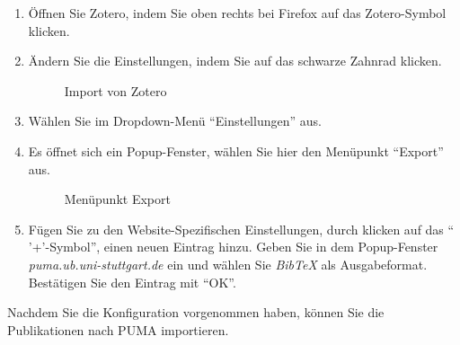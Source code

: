 \begin{enumerate}
    \item Öffnen Sie Zotero, indem Sie oben rechts bei Firefox auf das Zotero-Symbol klicken.
    \item Ändern Sie die Einstellungen, indem Sie auf das schwarze Zahnrad klicken. 
\begin{figure}[h!]
 \centering
 \caption{Import von Zotero}
 \label{fig:importZotero}
\end{figure}
    \item Wählen Sie im Dropdown-Menü \enquote{Einstellungen} aus.
    \item Es öffnet sich ein Popup-Fenster, wählen Sie hier den Menüpunkt \enquote{Export} aus.
\begin{figure}[h!]
 \centering
 \caption{Menüpunkt Export}
 \label{fig:menueExport}
\end{figure} 
    \item Fügen Sie zu den Website-Spezifischen Einstellungen, durch klicken auf das \enquote{ '+'-Symbol}, einen neuen Eintrag hinzu. Geben Sie in dem Popup-Fenster \textit{puma.ub.uni-stuttgart.de} ein und wählen Sie \textit{BibTeX} als Ausgabeformat. Bestätigen Sie den Eintrag mit \enquote{OK}. 
\end{enumerate}
Nachdem Sie die Konfiguration vorgenommen haben, können Sie die Publikationen nach PUMA importieren. 
